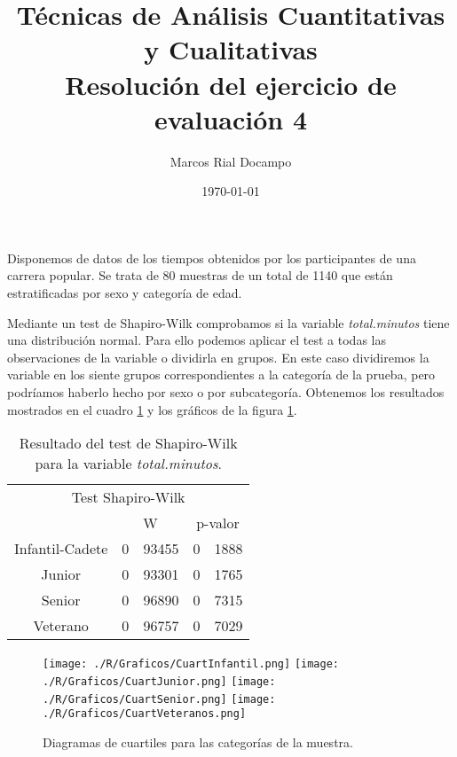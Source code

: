 \documentclass[11pt,a4paper]{article}
\author{Marcos Rial Docampo}
\title{Técnicas de Análisis Cuantitativas y Cualitativas\\Resolución del ejercicio de evaluación 4}
\date{\small{\today}}
\begin{document}
\maketitle

Disponemos de datos de los tiempos obtenidos por los participantes de una carrera popular. Se trata de 80 muestras de un total de 1140 que están estratificadas por sexo y categoría de edad.

Mediante un test de Shapiro-Wilk comprobamos si la variable \textit{total.minutos} tiene una distribución normal. Para ello podemos aplicar el test a todas las observaciones de la variable o dividirla en grupos. En este caso dividiremos la variable en los siente grupos correspondientes a la categoría de la prueba, pero podríamos haberlo hecho por sexo o por subcategoría. Obtenemos los resultados mostrados en el cuadro \ref{tab:Shapiro} y los gráficos de la figura \ref{fig:diagrama}.

\begin{table}[ht]
\centering
\begin{tabular}{cr@{,}lr@{,}l}
\toprule[0.4mm]
\multicolumn{5}{c}{Test Shapiro-Wilk}\\
 & \multicolumn{2}{c}{W} & \multicolumn{2}{c}{p-valor}\\
\midrule
Infantil-Cadete & 0&93455 & 0&1888\\
Junior & 0&93301 & 0&1765\\
Senior & 0&96890 & 0&7315\\
Veterano & 0&96757 & 0&7029\\
\bottomrule[0.4mm]
\end{tabular}
\caption{Resultado del test de Shapiro-Wilk para la variable \textit{total.minutos}.}
\label{tab:Shapiro}
\end{table}

\begin{figure}
\centering
\texttt{[image: ./R/Graficos/CuartInfantil.png]}
\texttt{[image: ./R/Graficos/CuartJunior.png]}
\texttt{[image: ./R/Graficos/CuartSenior.png]}
\texttt{[image: ./R/Graficos/CuartVeteranos.png]}
\caption{Diagramas de cuartiles para las categorías de la muestra.}
\label{fig:diagrama}
\end{figure}
\end{document}

